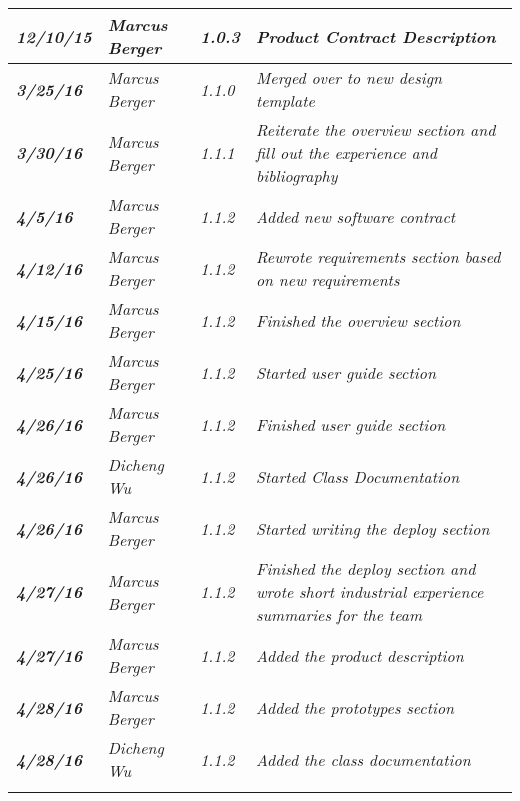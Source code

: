 \begin{tabular}{|>{\raggedright}p{1.5cm}|>{\raggedright}p{3cm}|>{\raggedright}p{1.5cm}|>{\raggedright}p{9cm}|}
\hline
\textit{\textbf{12/10/15}} & \textit{Marcus Berger} & \textit{1.0.3} & \textit{Product Contract Description}\tabularnewline
\hline
\textit{\textbf{3/25/16}} & \textit{Marcus Berger} & \textit{1.1.0} & \textit{Merged over to new design template}\tabularnewline
\hline
\textit{\textbf{3/30/16}} & \textit{Marcus Berger} & \textit{1.1.1} & \textit{Reiterate the overview section and fill out the experience and bibliography}\tabularnewline
\hline
\textit{\textbf{4/5/16}} & \textit{Marcus Berger} & \textit{1.1.2} & \textit{Added new software contract}\tabularnewline
\hline
\textit{\textbf{4/12/16}} & \textit{Marcus Berger} & \textit{1.1.2} & \textit{Rewrote requirements section based on new requirements }\tabularnewline
\hline
\textit{\textbf{4/15/16}} & \textit{Marcus Berger} & \textit{1.1.2} & \textit{Finished the overview section}\tabularnewline
\hline
\textit{\textbf{4/25/16}} & \textit{Marcus Berger} & \textit{1.1.2} & \textit{Started user guide section}\tabularnewline
\hline
\textit{\textbf{4/26/16}} & \textit{Marcus Berger} & \textit{1.1.2} & \textit{Finished user guide section}\tabularnewline
\hline
\textit{\textbf{4/26/16}} & \textit{Dicheng Wu} & \textit{1.1.2} & \textit{Started Class Documentation}\tabularnewline
\hline
\textit{\textbf{4/26/16}} & \textit{Marcus Berger} & \textit{1.1.2} & \textit{Started writing the deploy section}\tabularnewline
\hline
\textit{\textbf{4/27/16}} & \textit{Marcus Berger} & \textit{1.1.2} & \textit{Finished the deploy section and wrote short industrial experience summaries for the team}\tabularnewline
\hline
\textit{\textbf{4/27/16}} & \textit{Marcus Berger} & \textit{1.1.2} & \textit{Added the product description}\tabularnewline
\hline
\textit{\textbf{4/28/16}} & \textit{Marcus Berger} & \textit{1.1.2} & \textit{Added the prototypes section}\tabularnewline
\hline
\textit{\textbf{4/28/16}} & \textit{Dicheng Wu} & \textit{1.1.2} & \textit{Added the class documentation}\tabularnewline
\hline
 &  &  & \tabularnewline
\hline
\end{tabular}
\vfill

